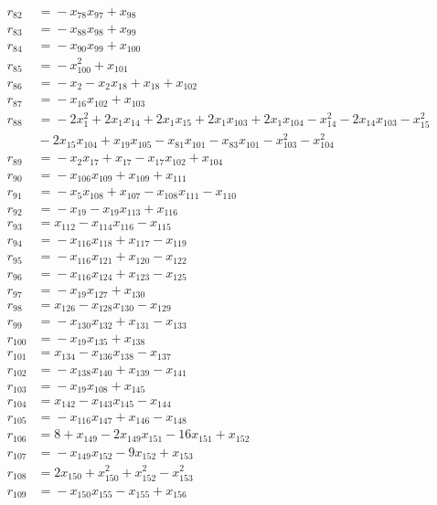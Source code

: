 \begin{align*}
r_{82} &={}-x_{78}x_{97} +x_{98} \\
r_{83} &={}-x_{88}x_{98} +x_{99} \\
r_{84} &={}-x_{90}x_{99} +x_{100} \\
r_{85} &={}-x_{100}^{2} +x_{101} \\
r_{86} &={}-x_{2} -x_{2}x_{18} +x_{18} +x_{102} \\
r_{87} &={}-x_{16}x_{102} +x_{103} \\
r_{88} &={}-2x_{1}^{2} +2x_{1}x_{14} +2x_{1}x_{15} +2x_{1}x_{103} +2x_{1}x_{104} -x_{14}^{2} -2x_{14}x_{103} -x_{15}^{2} \\
&{}-2x_{15}x_{104} +x_{19}x_{105} -x_{81}x_{101} -x_{83}x_{101} -x_{103}^{2} -x_{104}^{2} \\
r_{89} &={}-x_{2}x_{17} +x_{17} -x_{17}x_{102} +x_{104} \\
r_{90} &={}-x_{106}x_{109} +x_{109} +x_{111} \\
r_{91} &={}-x_{5}x_{108} +x_{107} -x_{108}x_{111} -x_{110} \\
r_{92} &={}-x_{19} -x_{19}x_{113} +x_{116} \\
r_{93} &={}x_{112} -x_{114}x_{116} -x_{115} \\
r_{94} &={}-x_{116}x_{118} +x_{117} -x_{119} \\
r_{95} &={}-x_{116}x_{121} +x_{120} -x_{122} \\
r_{96} &={}-x_{116}x_{124} +x_{123} -x_{125} \\
r_{97} &={}-x_{19}x_{127} +x_{130} \\
r_{98} &={}x_{126} -x_{128}x_{130} -x_{129} \\
r_{99} &={}-x_{130}x_{132} +x_{131} -x_{133} \\
r_{100} &={}-x_{19}x_{135} +x_{138} \\
r_{101} &={}x_{134} -x_{136}x_{138} -x_{137} \\
r_{102} &={}-x_{138}x_{140} +x_{139} -x_{141} \\
r_{103} &={}-x_{19}x_{108} +x_{145} \\
r_{104} &={}x_{142} -x_{143}x_{145} -x_{144} \\
r_{105} &={}-x_{116}x_{147} +x_{146} -x_{148} \\
r_{106} &={}8 +x_{149} -2x_{149}x_{151} -16x_{151} +x_{152} \\
r_{107} &={}-x_{149}x_{152} -9x_{152} +x_{153} \\
r_{108} &={}2x_{150} +x_{150}^{2} +x_{152}^{2} -x_{153}^{2} \\
r_{109} &={}-x_{150}x_{155} -x_{155} +x_{156} \\

\end{align*}
